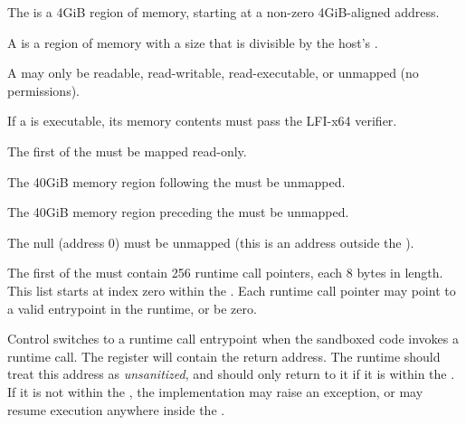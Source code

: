 


\specitem
The  is a 4GiB region of memory, starting at a non-zero 4GiB-aligned address.

\specitem
A  is a region of memory with a size that is divisible by the
host's .



\specitem
\label{specitem:page}
A  may only be readable, read-writable, read-executable, or unmapped
(no permissions).


\specitem
If a  is executable, its memory contents must pass the LFI-x64 verifier.

\specitem
The first  of the  must be mapped read-only.

\specitem
The 40GiB memory region following the  must be unmapped.

\specitem
The 40GiB memory region preceding the  must be unmapped.

\specitem
The null  (address 0) must be unmapped (this is an address outside the ).



\specitem
The first  of the  must contain 256 runtime call pointers, each 8 bytes in length. This list starts at index zero within the . Each runtime call pointer may point to a valid entrypoint in the runtime, or be zero.

\specitem
Control switches to a runtime call entrypoint when the sandboxed code invokes a runtime call. The  register will contain the return address. The runtime should treat this address as \textit{unsanitized}, and should only return to it if it is within the . If it is not within the , the implementation may raise an exception, or may resume execution anywhere inside the .
